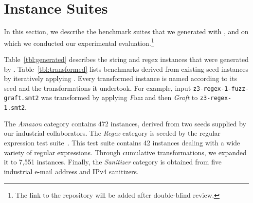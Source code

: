 \section{Instance Suites}
\label{sec:suites}

In this section, we describe the benchmark suites that we generated
with \fuzzer{}, and on which we conducted our experimental
evaluation.\footnote{The link to the repository will be added after
double-blind review.}

Table~\ref{tbl:generated} describes the string and regex instances that were
generated by \generator{}. Table~\ref{tbl:transformed} lists benchmarks
derived from existing seed instances by iteratively applying \transformer{}.
Every transformed instance is named according to its
seed and the transformations it undertook. For example, input
\texttt{z3-regex-1-fuzz-graft.smt2} was transformed by applying
\textit{Fuzz} and then \textit{Graft} to \texttt{z3-regex-1.smt2}.

The \textit{Amazon} category contains 472 instances, derived from two seeds
supplied by our industrial collaborators. The \textit{Regex} category is
seeded by the \usOld{} regular expression test suite~\cite{z3str2-tests}. This
test suite contains 42 instances dealing with a wide variety of regular
expressions. Through cumulative transformations, we expanded it to 7,551
instances. Finally, the \textit{Sanitizer} category is obtained from
five industrial e-mail address and IPv4 sanitizers.

